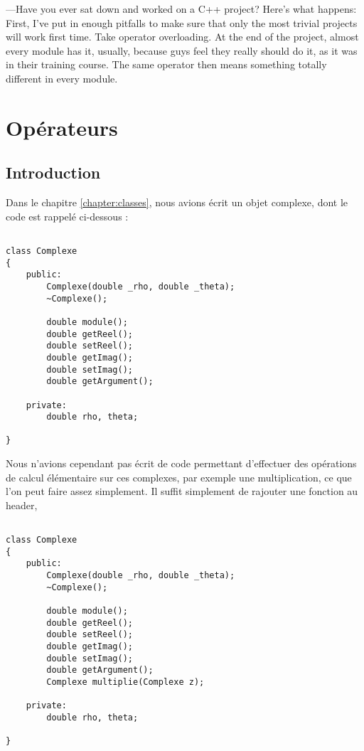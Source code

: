 \begin{savequote}[80mm]
---Have you ever sat down and worked on a C++ project?  Here's
    what happens: First, I've put in enough pitfalls to make sure
    that only the most trivial projects will work first time. Take
    operator overloading.  At the  end of the project, almost every module
    has it, usually, because  guys feel they really should do it, as it
    was in their training  course.  The same operator then means something
    totally different in every module.
\end{savequote}
\chapter{Op\'erateurs}
\label{chapter:operateurs}

\section{Introduction}
Dans le chapitre \ref{chapter:classes}, nous avions \'ecrit un objet complexe, dont le code est rappel\'e ci-dessous :

\begin{lstlisting}[caption = complexe3.h]

class Complexe
{
    public:
        Complexe(double _rho, double _theta);
        ~Complexe();

        double module();
        double getReel();
        double setReel();
        double getImag();
        double setImag();
        double getArgument();

    private:
        double rho, theta;

}
\end{lstlisting}


Nous n'avions cependant pas \'ecrit de code permettant d'effectuer des op\'erations de calcul \'el\'ementaire sur ces complexes, par exemple une multiplication, ce que l'on peut faire assez
simplement. Il suffit simplement de rajouter une fonction au header,
\begin{lstlisting}[caption = complexe4.h]

class Complexe
{
    public:
        Complexe(double _rho, double _theta);
        ~Complexe();

        double module();
        double getReel();
        double setReel();
        double getImag();
        double setImag();
        double getArgument();
        Complexe multiplie(Complexe z);

    private:
        double rho, theta;

}
\end{lstlisting}

